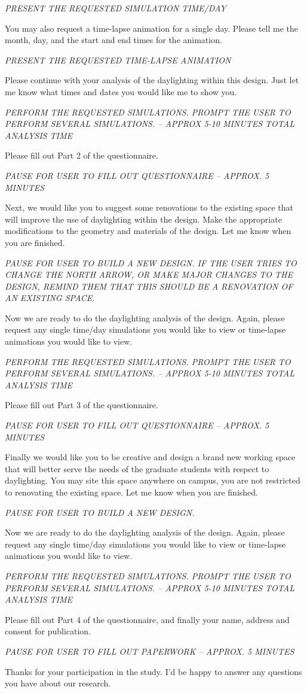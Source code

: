 \documentclass[12pt]{article}
\begin{document}
{\em PRESENT THE REQUESTED SIMULATION TIME/DAY }

You may also request a time-lapse animation for a single day.  Please
tell me the month, day, and the start and end times for the animation.

{\em PRESENT THE REQUESTED TIME-LAPSE ANIMATION }

Please continue with your analysis of the daylighting within this
design.  Just let me know what times and dates you would like me to show
you.

{\em PERFORM THE REQUESTED SIMULATIONS.  PROMPT THE USER TO PERFORM
  SEVERAL SIMULATIONS.  -- APPROX 5-10 MINUTES TOTAL ANALYSIS TIME }

Please fill out Part 2 of the questionnaire.

{\em PAUSE FOR USER TO FILL OUT QUESTIONNAIRE  --  APPROX. 5 MINUTES }

Next, we would like you to suggest some renovations to the existing
space that will improve the use of daylighting within the design.
Make the appropriate modifications to the geometry and materials of
the design.  Let me know when you are finished.

{\em PAUSE FOR USER TO BUILD A NEW DESIGN.  IF THE USER TRIES TO
  CHANGE THE NORTH ARROW, OR MAKE MAJOR CHANGES TO THE DESIGN, REMIND
  THEM THAT THIS SHOULD BE A RENOVATION OF AN EXISTING SPACE.  }

Now we are ready to do the daylighting analysis of the design.  Again,
please request any single time/day simulations you would like to view
or time-lapse animations you would like to view.

{\em PERFORM THE REQUESTED SIMULATIONS.  PROMPT THE USER TO PERFORM
  SEVERAL SIMULATIONS.  -- APPROX 5-10 MINUTES TOTAL ANALYSIS TIME }

Please fill out Part 3 of the questionnaire.

{\em PAUSE FOR USER TO FILL OUT QUESTIONNAIRE  --  APPROX. 5 MINUTES }

Finally we would like you to be creative and design a brand new
working space that will better serve the needs of the graduate
students with respect to daylighting.  You may site this space
anywhere on campus, you are not restricted to renovating the existing
space.  Let me know when you are finished.

{\em PAUSE FOR USER TO BUILD A NEW DESIGN. }

Now we are ready to do the daylighting analysis of the design.  Again,
please request any single time/day simulations you would like to view
or time-lapse animations you would like to view.

{\em PERFORM THE REQUESTED SIMULATIONS.  PROMPT THE USER TO PERFORM
  SEVERAL SIMULATIONS.  -- APPROX 5-10 MINUTES TOTAL ANALYSIS TIME }

Please fill out Part 4 of the questionnaire, and finally your name,
address and consent for publication.

{\em PAUSE FOR USER TO FILL OUT PAPERWORK  --  APPROX. 5 MINUTES }

Thanks for your participation in the study.  I'd be happy to answer
any questions you have about our research.  
\end{document}
